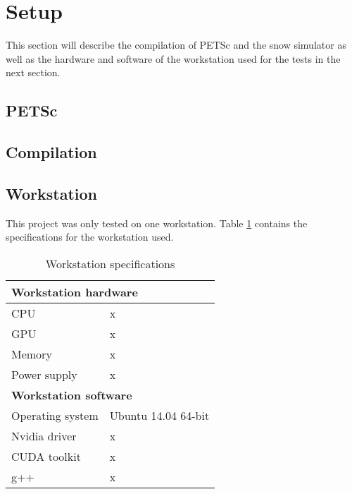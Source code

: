 \section{Setup}

This section will describe the compilation of PETSc and the snow simulator as well 
as the hardware and software of the workstation used for the tests in the next section. 

\subsection{PETSc}

\subsection{Compilation}

\subsection{Workstation}

This project was only tested on one workstation. Table \ref{tab:workstation} contains 
the specifications for the workstation used.

\begin{table}[h]
\begin{center}
\begin{tabular}{|l|l|}
\hline
\multicolumn{2}{|l|}{\textbf{Workstation hardware}} \\ \hline
 CPU & x \\ \hline
 GPU & x \\ \hline
 Memory & x \\ \hline
 Power supply & x \\ \hline
\multicolumn{2}{|l|}{\textbf{Workstation software}} \\ \hline
 Operating system & Ubuntu 14.04 64-bit \\ \hline
 Nvidia driver & x \\ \hline
 CUDA toolkit & x \\ \hline
 g++ & x \\ \hline
\end{tabular}
\end{center}
\label{tab:workstation}
\caption{Workstation specifications}
\end{table}
